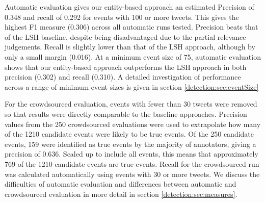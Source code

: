 Automatic evaluation gives our entity-based approach an estimated Precision of 0.348 and recall of 0.292 for events with 100 or more tweets.
This gives the highest F1 measure (0.306) across all automatic runs tested.
Precision beats that of the LSH baseline, despite being disadvantaged due to the partial relevance judgements.
Recall is slightly lower than that of the LSH approach, although by only a small margin (0.016).
At a minimum event size of 75, automatic evaluation shows that our entity-based approach outperforms the LSH approach in both precision (0.302) and recall (0.310).
A detailed investigation of performance across a range of minimum event sizes is given in section \ref{detection:sec:eventSize}

For the crowdsourced evaluation, events with fewer than 30 tweets were removed so that results were directly comparable to the baseline approaches.
Precision values from the 250 crowdsourced evaluations were used to extrapolate how many of the 1210 candidate events were likely to be true events.
Of the 250 candidate events, 159 were identified as true events by the majority of annotators, giving a precision of 0.636.
Scaled up to include all events, this means that approximately 769 of the 1210 candidate events are true events.
Recall for the crowdsourced run was calculated automatically using events with 30 or more tweets.
We discuss the difficulties of automatic evaluation and differences between automatic and crowdsourced evaluation in more detail in section \ref{detection:sec:measures}.




